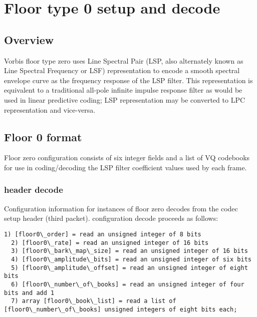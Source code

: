\section{Floor type 0 setup and decode} \label{vorbis:spec:floor0}

\subsection{Overview}

Vorbis floor type zero uses Line Spectral Pair (LSP, also alternately
known as Line Spectral Frequency or LSF) representation to encode a
smooth spectral envelope curve as the frequency response of the LSP
filter.  This representation is equivalent to a traditional all-pole
infinite impulse response filter as would be used in linear predictive
coding; LSP representation may be converted to LPC representation and
vice-versa.



\subsection{Floor 0 format}

Floor zero configuration consists of six integer fields and a list of
VQ codebooks for use in coding/decoding the LSP filter coefficient
values used by each frame.

\subsubsection{header decode}

Configuration information for instances of floor zero decodes from the
codec setup header (third packet).  configuration decode proceeds as
follows:

\begin{Verbatim}[commandchars=\\\{\}]
  1) [floor0\_order] = read an unsigned integer of 8 bits
  2) [floor0\_rate] = read an unsigned integer of 16 bits
  3) [floor0\_bark\_map\_size] = read an unsigned integer of 16 bits
  4) [floor0\_amplitude\_bits] = read an unsigned integer of six bits
  5) [floor0\_amplitude\_offset] = read an unsigned integer of eight bits
  6) [floor0\_number\_of\_books] = read an unsigned integer of four bits and add 1
  7) array [floor0\_book\_list] = read a list of [floor0\_number\_of\_books] unsigned integers of eight bits each;
\end{Verbatim}

